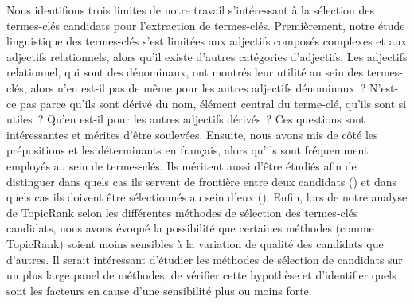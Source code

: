     Nous identifions trois limites de notre travail s'intéressant à la sélection
    des termes-clés candidats pour l'extraction de termes-clés. Premièrement,
    notre étude linguistique des termes-clés s'est limitées aux adjectifs
    composés complexes et aux adjectifs relationnels, alors qu'il existe
    d'autres catégories d'adjectifs. Les adjectifs relationnel, qui sont des
    dénominaux, ont montrés leur utilité au sein des termes-clés, alors n'en
    est-il pas de même pour les autres adjectifs dénominaux~? N'est-ce pas parce
    qu'ils sont dérivé du nom, élément central du terme-clé, qu'ils sont si
    utiles~? Qu'en est-il pour les autres adjectifs dérivés~? Ces questions sont
    intéressantes et mérites d'être soulevées. Ensuite, nous avons mis de côté
    les prépositions et les déterminants en français, alors qu'ils sont
    fréquemment employés au sein de termes-clés. Ils méritent aussi d'être
    étudiés afin de distinguer dans quels cas ils servent de frontière entre
    deux candidats () et dans quels cas ils doivent être
    sélectionnés au sein d'eux (). Enfin, lors de notre analyse de
    TopicRank selon les différentes méthodes de sélection des termes-clés
    candidats, nous avons évoqué la possibilité que certaines méthodes (comme
    TopicRank) soient moins sensibles à la variation de qualité des candidats
    que d'autres. Il serait intéressant d'étudier les méthodes de sélection de
    candidats sur un plus large panel de méthodes, de vérifier cette hypothèse
    et d'identifier quels sont les facteurs en cause d'une sensibilité plus ou
    moins forte.


